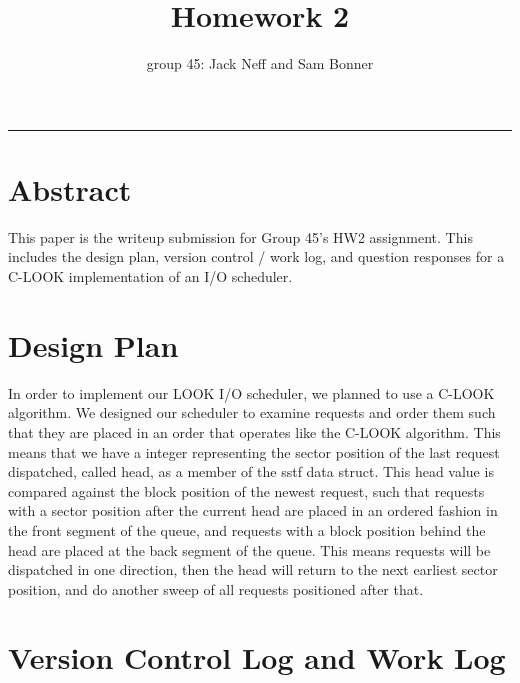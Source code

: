\documentclass[letterpaper,10pt,fleqn]{article}
\title{Homework 2}
\author{group 45: Jack Neff and Sam Bonner}
\begin{document}
\maketitle
\hrule

\section*{Abstract}

This paper is the writeup submission for Group 45's HW2 assignment. This includes the design plan, version control / work log, and question responses for a C-LOOK implementation of an I/O scheduler.

\pagebreak
\section*{Design Plan}

In order to implement our LOOK I/O scheduler, we planned to use a C-LOOK algorithm. We designed our scheduler to examine requests and order them such that they are placed in an order that operates like the C-LOOK algorithm. This means that we have a integer representing the sector position of the last request dispatched, called head, as a member of the sstf data struct. This head value is compared against the block position of the newest request, such that requests with a sector position after the current head are placed in an ordered fashion in the front segment of the queue, and requests with a block position behind the head are placed at the back segment of the queue. This means requests will be dispatched in one direction, then the head will return to the next earliest sector position, and do another sweep of all requests positioned after that.

\section{Version Control Log and Work Log}
 
\end{document}
